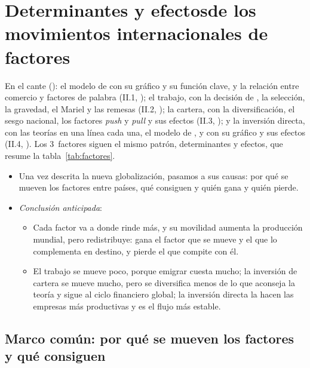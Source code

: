 \documentclass[11pt]{article}
\begin{document}
\section{Determinantes y efectos\cortetitulo de los movimientos internacionales de factores}\label{sec:factores}

\begin{notaopositor}
En el cante (): el modelo de  con su gráfico y su función clave, y la relación entre comercio y factores de palabra (II.1, ); el trabajo, con la decisión de , la selección, la gravedad, el Mariel y las remesas (II.2, ); la cartera, con la diversificación, el sesgo nacional, los factores \emph{push} y \emph{pull} y sus efectos (II.3, ); y la inversión directa, con las teorías en una línea cada una, el modelo de ,  y  con su gráfico y sus efectos (II.4, ). Los 3~factores siguen el mismo patrón, determinantes y efectos, que resume la tabla~\ref{tab:factores}.
\end{notaopositor}

\begin{itemize}
\item Una vez descrita la nueva globalización, pasamos a sus causas: por qué se mueven los factores entre países, qué consiguen y quién gana y quién pierde.
\item \emph{Conclusión anticipada}:
  \begin{itemize}
  \item Cada factor va a donde rinde más, y su movilidad aumenta la producción mundial, pero redistribuye: gana el factor que se mueve y el que lo complementa en destino, y pierde el que compite con él.
  \item El trabajo se mueve poco, porque emigrar cuesta mucho; la inversión de cartera se mueve mucho, pero se diversifica menos de lo que aconseja la teoría y sigue al ciclo financiero global; la inversión directa la hacen las empresas más productivas y es el flujo más estable.
  \end{itemize}
\end{itemize}

\subsection{Marco común: por qué se mueven los factores y qué consiguen}\label{sec:marco}
\end{document}
